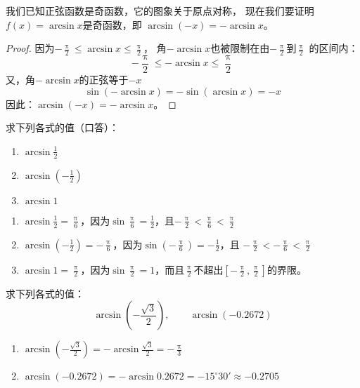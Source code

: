 我们已知正弦函数是奇函数，它的图象关于原点对称，
现在我们要证明 $f(x)=\arcsin x$是奇函数，即
$\arcsin(-x)=-\arcsin x$。

\begin{proof}
    因为$-\frac{\uppi}{2}\leqslant \arcsin x\leqslant \frac{\uppi}{2}$，
    角$-\arcsin x$也被限制在由$-\frac{\uppi}{2}$到$\frac{\uppi}{2}$
    的区间内：
    $$-\frac{\uppi}{2}\leqslant -\arcsin x\leqslant \frac{\uppi}{2}$$
    又，角$-\arcsin x$的正弦等于$-x$
\[\sin(-\arcsin x)=-\sin(\arcsin x)=-x\]
因此：$\arcsin(-x)=-\arcsin x$。
\end{proof}

\begin{example}
    求下列各式的值（口答）：
    \begin{enumerate}
        \item $\arcsin\frac{1}{2}$
        \item $\arcsin\left(-\frac{1}{2}\right)$
        \item $\arcsin 1$
    \end{enumerate}
\end{example}

\begin{solution}
\begin{enumerate}
    \item $\arcsin\frac{1}{2}=\frac{\uppi}{6}$，因为$\sin\frac{\uppi}{6}=\frac{1}{2}$，且$-\frac{\uppi}{2}<\frac{\uppi}{6}<\frac{\uppi}{2}$

    \item $\arcsin\left(-\frac{1}{2}\right)=-\frac{\uppi}{6}$，因为$\sin\left(-\frac{\uppi}{6}\right)=-\frac{1}{2}$，且
    $-\frac{\uppi}{2}<-\frac{\uppi}{6}<\frac{\uppi}{2}$
    \item $\arcsin 1=\frac{\uppi}{2}$，因为$\sin\frac{\uppi}{2}=1$，而且$\frac{\uppi}{2}$不超出$\left[-\frac{\uppi}{2},\frac{\uppi}{2}\right]$的界限。
\end{enumerate}
\end{solution}

\begin{example}
    求下列各式的值：
\[\arcsin\left(-\frac{\sqrt{3}}{2}\right),\qquad \arcsin (-0.2672) \]
\end{example}

\begin{solution}
\begin{enumerate}
    \item $\arcsin\left(-\frac{\sqrt{3}}{2}\right)=-\arcsin\frac{\sqrt{3}}{2}=-\frac{\uppi}{3}$
    \item $\arcsin(-0.2672)=-\arcsin0.2672=-15^{\circ}30'\approx -0.2705$
\end{enumerate}
    
\end{solution}



